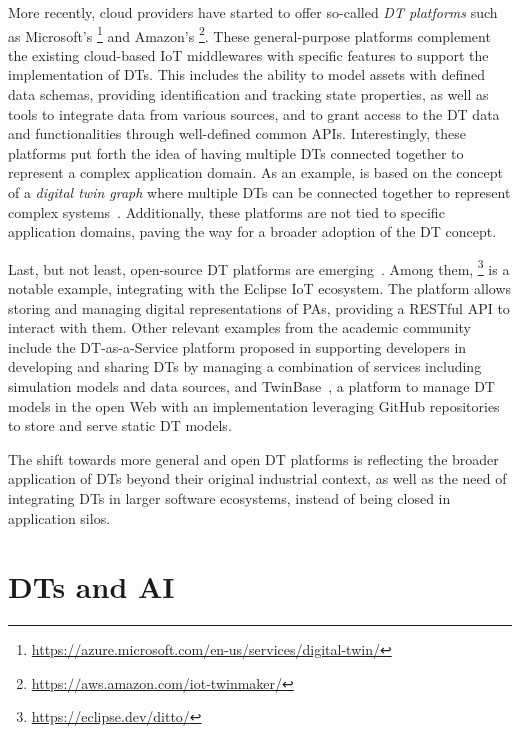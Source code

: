 More recently, cloud providers have started to offer so-called \emph{\ac{DT} platforms} such as Microsoft's \azureTwin{}\footnote{\url{https://azure.microsoft.com/en-us/services/digital-twin/}} and Amazon's \awsTwin{}\footnote{\url{https://aws.amazon.com/iot-twinmaker/}}.
%
These general-purpose platforms complement the existing cloud-based \ac{IoT} middlewares with specific features to support the implementation of \acp{DT}. 
This includes the ability to model assets with defined data schemas, providing identification and tracking state properties,
as well as tools to integrate data from various sources, and to grant access to the \ac{DT} data and functionalities through well-defined common \acp{API}.
%
Interestingly, these platforms put forth the idea of having multiple \acp{DT} connected together to represent a complex application domain. 
%
As an example, \azureTwin{} is based on the concept of a \emph{digital twin graph} where multiple \acp{DT} can be connected together to represent complex systems~\cite{Meijers_2022}.
%
Additionally, these platforms are not tied to specific application domains, paving the way for a broader adoption of the \ac{DT} concept. 

Last, but not least, open-source \ac{DT} platforms are emerging~\cite{Gil_Mikkelsen_Gomes_Larsen_2024}.
Among them, \ditto{}\footnote{\url{https://eclipse.dev/ditto/}} is a notable example, integrating with the Eclipse \ac{IoT} ecosystem. 
%
The platform allows storing and managing digital representations of \acp{PA}, providing a RESTful \ac{API} to interact with them. 
%
Other relevant examples from the academic community include
the \ac{DT}-as-a-Service platform proposed in \cite{Talasila_Gomes_Mikkelsen_Arboleda_Kamburjan_Larsen_2023} supporting developers in developing and sharing \acp{DT} by managing a combination of services including simulation models and data sources,
and TwinBase~\cite{Autiosalo_Siegel_Tammi_2021}, a platform to manage \ac{DT} models in the open Web with an implementation leveraging GitHub repositories to store and serve static \ac{DT} models.

The shift towards more general and open \ac{DT} platforms is reflecting the broader application of \acp{DT} beyond their original industrial context, as well as the need of integrating \acp{DT} in larger software ecosystems, instead of being closed in application silos. 

\section{\aclp{DT} and \acl{AI}}


